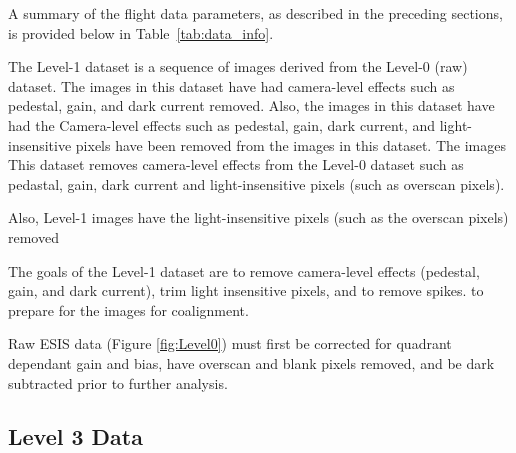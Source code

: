   
    
    	
    	
    	A summary of the flight data parameters, as described in the preceding sections, is provided below in Table~\ref{tab:data_info}. 
    	
    
        The Level-1 dataset is a sequence of images derived from the Level-0 (raw) dataset.
        The images in this dataset have had camera-level effects such as pedestal, gain, and dark current removed.
        Also, the images in this dataset have had the 
        Camera-level effects such as pedestal, gain, dark current, and light-insensitive pixels have been removed from the images in this dataset.
        The images 
        This dataset removes camera-level effects from the Level-0 dataset such as pedastal, gain, dark current and light-insensitive pixels (such as overscan pixels).
        
        
        Also, Level-1 images have the light-insensitive pixels (such as the overscan pixels) removed 
    
        The goals of the Level-1 dataset are to remove camera-level effects (pedestal, gain, and dark current), trim light insensitive pixels, and to remove spikes. to prepare for the images for coalignment.
    
       Raw ESIS data (Figure \ref{fig:Level0}) must first be corrected for quadrant dependant gain and bias, have overscan and blank pixels removed, and be dark subtracted prior to further analysis.
       
	       


    \subsection{Level 3 Data}
 
